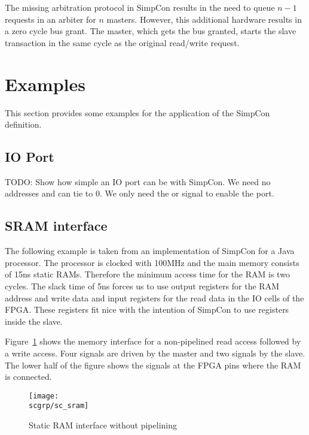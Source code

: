 The missing arbitration protocol in SimpCon results in the need to
queue $n-1$ requests in an arbiter for $n$ masters. However, this
additional hardware results in a zero cycle bus grant. The master,
which gets the bus granted, starts the slave transaction in the same
cycle as the original read/write request.



\section{Examples}

This section provides some examples for the application of the
SimpCon definition.

\subsection{IO Port}

TODO: Show how simple an IO port can be with SimpCon. We need no
addresses and can tie  to 0. We only need the
 or  signal to enable the port.

\subsection{SRAM interface}

The following example is taken from an implementation of SimpCon for
a Java processor. The processor is clocked with 100MHz and the main
memory consists of 15ns static RAMs. Therefore the minimum access
time for the RAM is two cycles. The slack time of 5ns forces us to
use output registers for the RAM address and write data and input
registers for the read data in the IO cells of the FPGA. These
registers fit nice with the intention of SimpCon to use registers
inside the slave.

Figure~\ref{fig:sc:sram} shows the memory interface for a
non-pipelined read access followed by a write access. Four signals
are driven by the master and two signals by the slave. The lower
half of the figure shows the signals at the FPGA pins where the RAM
is connected.


\begin{figure}
    \centering
    \texttt{[image: \\scgrp/sc\_sram]}
    \caption{Static RAM interface without pipelining}
    \label{fig:sc:sram}
\end{figure}

